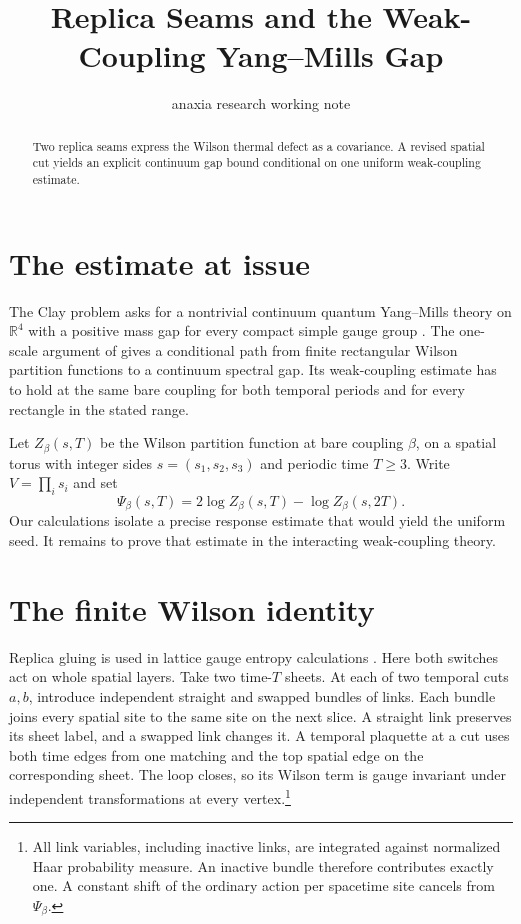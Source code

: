 \documentclass[11pt]{amsart}
\title[Replica seams and the Wilson thermal defect]{Replica Seams and the Weak-Coupling Yang--Mills Gap}
\date{anaxia research working note}
\begin{document}
\begin{abstract}
Two replica seams express the Wilson thermal defect as a covariance. A revised spatial cut yields an explicit continuum gap bound conditional on one uniform weak-coupling estimate.
\end{abstract}
\maketitle

\section{The estimate at issue}

The Clay problem asks for a nontrivial continuum quantum Yang--Mills theory on
\(\mathbb R^4\) with a positive mass gap for every compact simple gauge group
\cite{JW}. The one-scale argument of \cite{OneScale} gives a conditional path
from finite rectangular Wilson partition functions to a continuum spectral
gap. Its weak-coupling estimate has to hold at the same bare coupling for
both temporal periods and for every rectangle in the stated range.

Let \(Z_\beta(s,T)\) be the Wilson partition function at bare coupling
\(\beta\), on a spatial torus with integer sides \(s=(s_1,s_2,s_3)\) and
periodic time \(T\ge3\). Write \(V=\prod_i s_i\) and set
\[
 \Psi_\beta(s,T)=2\log Z_\beta(s,T)-\log Z_\beta(s,2T).
\]
Our calculations isolate a precise response estimate that would yield
the uniform seed. It remains to prove that estimate in the interacting
weak-coupling theory.

\section{The finite Wilson identity}

Replica gluing is used in lattice gauge entropy calculations \cite{Replica}.
Here both switches act on whole spatial layers. Take two time-\(T\)
sheets. At each of two temporal cuts \(a,b\), introduce
independent straight and swapped bundles of links. Each bundle joins every
spatial site to the same site on the next slice. A straight link preserves
its sheet label, and a swapped link changes it. A temporal plaquette at a
cut uses both time edges from one matching and the top spatial edge on
the corresponding sheet. The loop closes, so its Wilson term is gauge
invariant under independent transformations at every vertex.\footnote{All
 link variables, including inactive links, are integrated against normalized
 Haar probability measure. An inactive bundle therefore contributes exactly
 one. A constant shift of the ordinary action per spacetime site cancels
 from \(\Psi_\beta\).}
\end{document}
